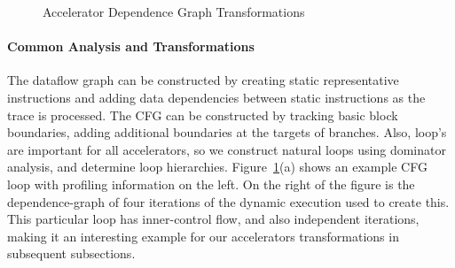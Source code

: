 \begin{figure}


  \vspace{-0.18in}
  \caption{Accelerator Dependence Graph Transformations}
  \label{fig:transformations}
\end{figure}


\paragraph{Common Analysis and Transformations}
The dataflow graph can be constructed by creating static representative instructions
and adding data dependencies between static instructions
as the trace is processed.  The CFG can be constructed by tracking
basic block boundaries, adding additional boundaries at the targets of branches.
Also, loop's are important for all accelerators, so
we construct natural loops using dominator analysis, and determine loop hierarchies.  
Figure~\ref{fig:transformations}(a) shows an example CFG loop with profiling 
information on the left.  On the right of the figure is the dependence-graph
of four iterations of the dynamic execution used to create this.  This particular loop
has inner-control flow, and also independent iterations, making it an interesting example
for our accelerators transformations in subsequent subsections.

